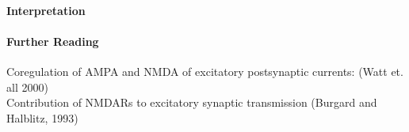 \documentclass[11pt]{article}
\begin{document}
\paragraph{Interpretation}

\paragraph{Further Reading}
Coregulation of AMPA and NMDA of excitatory postsynaptic currents: (Watt et. all 2000) \\
Contribution of NMDARs to excitatory synaptic transmission (Burgard and Halblitz, 1993) \\
\end{document}
